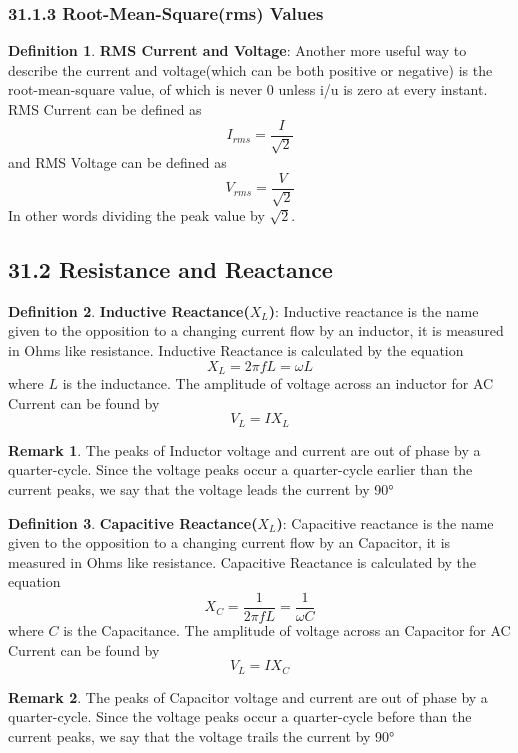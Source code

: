 \documentclass[12pt]{amsart}
\theoremstyle{definition}
\newtheorem{definition}{Definition} %
\newtheorem*{remark}{Remark}        %
\numberwithin{equation}{theorem}    %
\begin{document}
\subsubsection*{31.1.3 Root-Mean-Square(rms) Values}

\begin{definition}
    \textbf{RMS Current and Voltage}:
    Another more useful way to describe the current and voltage(which can be both positive or negative) is the root-mean-square value, of which is never 0 unless i/u is zero at every instant. RMS Current can be defined as $$I_{rms} = \frac{I}{\sqrt{2}}$$ and RMS Voltage can be defined as$$V_{rms} = \frac{V}{\sqrt{2}}$$ In other words dividing the peak value by $\sqrt{2}$.
\end{definition}

\subsection*{31.2 Resistance and Reactance}

\begin{definition}
    \textbf{Inductive Reactance($X_L$)}:
    Inductive reactance is the name given to the opposition to a changing current flow by an inductor, it is measured in Ohms like resistance. Inductive Reactance is calculated by the equation 
    $$X_L = 2\pi f L = \omega L$$ where $L$ is the inductance. The amplitude of voltage across an inductor for AC Current can be found by $$V_L = IX_L$$
    \begin{remark}
        The peaks of Inductor voltage and current are out of phase by a quarter-cycle. Since the voltage peaks occur a quarter-cycle earlier than the current peaks, we say that the voltage leads the current by 90°
    \end{remark}
\end{definition}

\begin{definition}
    \textbf{Capacitive Reactance($X_L$)}:
    Capacitive reactance is the name given to the opposition to a changing current flow by an Capacitor, it is measured in Ohms like resistance. Capacitive Reactance is calculated by the equation 
    $$X_C = \frac{1}{2\pi f L} = \frac{1}{\omega C}$$ where $C$ is the Capacitance. The amplitude of voltage across an Capacitor for AC Current can be found by $$V_L = IX_C$$
    \begin{remark}
        The peaks of Capacitor voltage and current are out of phase by a quarter-cycle. Since the voltage peaks occur a quarter-cycle before than the current peaks, we say that the voltage trails the current by 90°
    \end{remark}
\end{definition}
\end{document}
